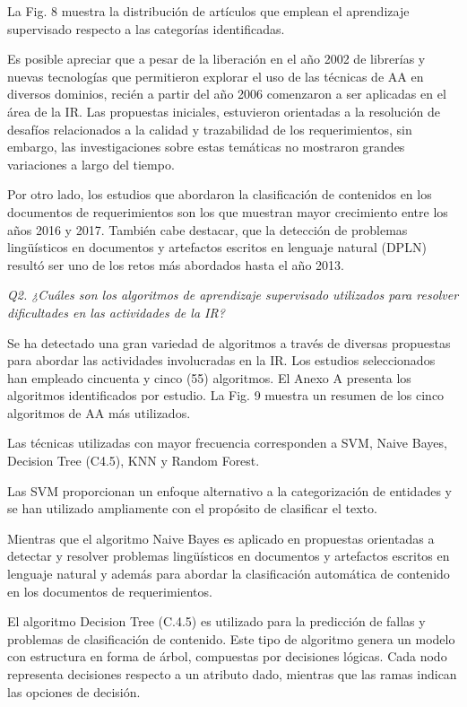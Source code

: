 \documentclass[journal]{IEEEtran}
\begin{document}
La Fig. 8 muestra la distribución de artículos que emplean el aprendizaje supervisado respecto a las categorías identificadas.

Es posible apreciar que a pesar de la liberación en el año 2002 de librerías y nuevas tecnologías que permitieron explorar el uso de las técnicas de AA en diversos dominios, recién a partir del año 2006 comenzaron a ser aplicadas en el área de la IR. Las propuestas iniciales, estuvieron orientadas a la resolución de desafíos relacionados a la calidad y trazabilidad de los requerimientos, sin embargo, las investigaciones sobre estas temáticas no mostraron grandes variaciones a largo del tiempo. 

Por otro lado, los estudios que abordaron la clasificación de contenidos en los documentos de requerimientos son los que muestran mayor crecimiento entre los años 2016 y 2017. También cabe destacar, que la detección de problemas lingüísticos en documentos y artefactos escritos en lenguaje natural (DPLN) resultó ser uno de los retos más abordados hasta el año 2013.

\emph{Q2. ¿Cuáles son los algoritmos de aprendizaje supervisado utilizados para resolver dificultades en las actividades de la IR?}

Se ha detectado una gran variedad de algoritmos a través de diversas propuestas para abordar las actividades involucradas en la IR. Los estudios seleccionados han empleado cincuenta y cinco (55) algoritmos. El Anexo A presenta los algoritmos identificados por estudio. La Fig. 9 muestra un resumen de los cinco algoritmos de AA más utilizados.

Las técnicas utilizadas con mayor frecuencia corresponden a SVM, Naive Bayes, Decision Tree (C4.5), KNN y Random Forest. 

Las SVM proporcionan un enfoque alternativo a la categorización de entidades y se han utilizado ampliamente con el propósito de clasificar el texto.

Mientras que el algoritmo Naive Bayes es aplicado en propuestas orientadas a detectar y resolver problemas lingüísticos en documentos y artefactos escritos en lenguaje natural y además para abordar la clasificación automática de contenido en los documentos de requerimientos. 

El algoritmo Decision Tree (C.4.5) es utilizado para la predicción de fallas y problemas de clasificación de contenido. Este tipo de algoritmo genera un modelo con estructura en forma de árbol, compuestas por decisiones lógicas. Cada nodo representa decisiones respecto a un atributo dado, mientras que las ramas indican las opciones de decisión. 
\end{document}
